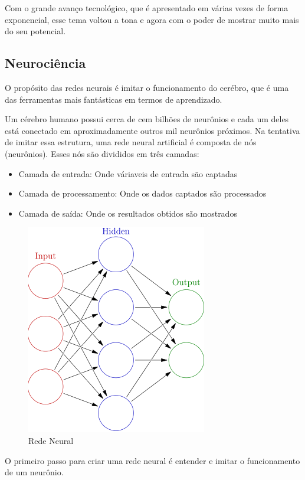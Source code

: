 Com o grande avanço tecnológico, que é apresentado em várias vezes de forma exponencial, esse tema voltou a tona e agora com o poder de mostrar
muito mais do seu potencial.

\subsection{Neurociência}

O propósito das redes neurais é imitar o funcionamento do cerébro, que é uma das ferramentas mais fantásticas em termos de aprendizado.\cite{marilee}

Um cérebro humano possui cerca de cem bilhões de neurônios e cada um deles está conectado em aproximadamente outros mil neurônios próximos. \cite{kandel}
Na tentativa de imitar essa estrutura, uma rede neural artificial é composta de nós (neurônios). Esses nós são divididos em três camadas:

\begin{itemize}
	\item Camada de entrada: Onde váriaveis de entrada são captadas
	\item Camada de processamento: Onde os dados captados são processados
	\item Camada de saída: Onde os resultados obtidos são mostrados
\end{itemize}

\begin{figure}[h]
	\centering
	\includegraphics[keepaspectratio=true,scale=0.5]{figuras/neuron.png}
	\caption{Rede Neural \cite{glosser}}
	\label{fig08}
\end{figure}

O primeiro passo para criar uma rede neural é entender e imitar o funcionamento de um neurônio.

